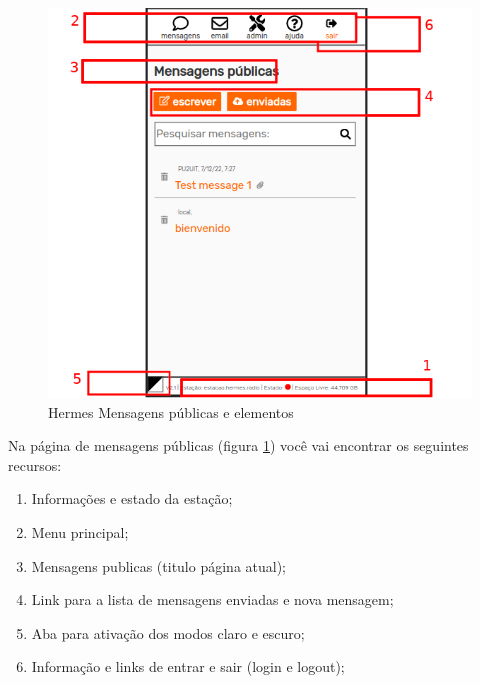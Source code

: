 \documentclass[11pt,a4paper]{article}
\begin{document}
    \begin{figure}[H]
    \centering
    \includegraphics[width=1\columnwidth]{screenshots/frontend/pt_kn/messagesindex_pt.png}
    \caption{Hermes Mensagens públicas e elementos}
    \label{fig:messagesindex}
    \end{figure}
    
Na página de mensagens públicas (figura \ref{fig:messagesindex}) você vai encontrar os seguintes recursos:

\begin{enumerate}
    \item Informações e estado da estação;
    \item Menu principal;
    \item Mensagens publicas (titulo página atual);
    \item Link para a lista de mensagens enviadas e nova mensagem;
    \item Aba para ativação dos modos claro e escuro;
    \item Informação e links de entrar e sair (login e logout);
\end{enumerate}
\end{document}

